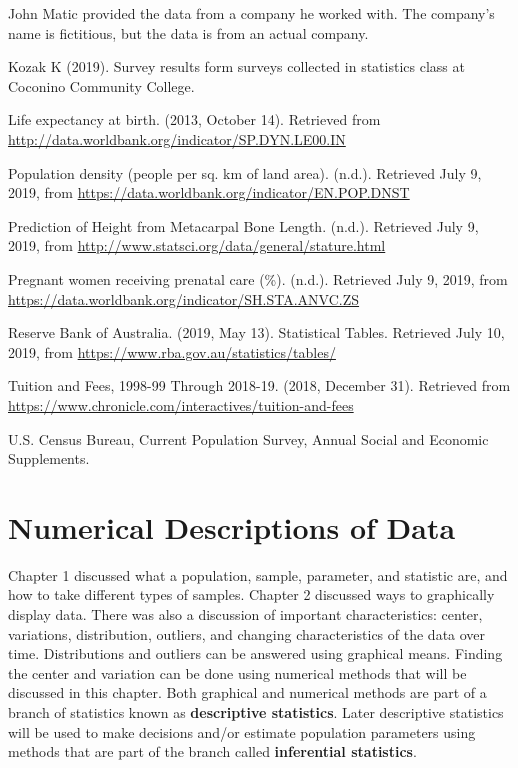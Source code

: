 \documentclass[
]{book}
\begin{document}
John Matic provided the data from a company he worked with. The company's name is fictitious, but the data is from an actual company.

Kozak K (2019). Survey results form surveys collected in statistics class at Coconino Community College.

Life expectancy at birth. (2013, October 14). Retrieved from
\url{http://data.worldbank.org/indicator/SP.DYN.LE00.IN}

Population density (people per sq. km of land area). (n.d.). Retrieved July 9, 2019, from \url{https://data.worldbank.org/indicator/EN.POP.DNST}

Prediction of Height from Metacarpal Bone Length. (n.d.). Retrieved July 9, 2019, from \url{http://www.statsci.org/data/general/stature.html}

Pregnant women receiving prenatal care (\%). (n.d.). Retrieved July 9, 2019, from \url{https://data.worldbank.org/indicator/SH.STA.ANVC.ZS}

Reserve Bank of Australia. (2019, May 13). Statistical Tables. Retrieved July 10, 2019, from \url{https://www.rba.gov.au/statistics/tables/}

Tuition and Fees, 1998-99 Through 2018-19. (2018, December 31). Retrieved from \url{https://www.chronicle.com/interactives/tuition-and-fees}

U.S. Census Bureau, Current Population Survey, Annual Social and Economic Supplements.

\hypertarget{numerical-descriptions-of-data}{%
\chapter{Numerical Descriptions of Data}\label{numerical-descriptions-of-data}}

Chapter 1 discussed what a population, sample, parameter, and statistic are, and how to take different types of samples. Chapter 2 discussed ways to graphically display data. There was also a discussion of important characteristics: center, variations, distribution, outliers, and changing characteristics of the data over time. Distributions and outliers can be answered using graphical means. Finding the center and variation can be done using numerical methods that will be discussed in this chapter. Both graphical and numerical methods are part of a branch of statistics known as \textbf{descriptive statistics}. Later descriptive statistics will be used to make decisions and/or estimate population parameters using methods that are part of the branch called \textbf{inferential statistics}.
\end{document}
